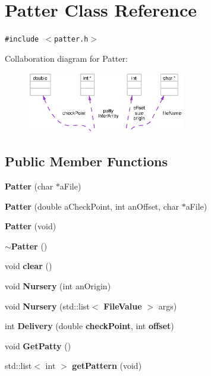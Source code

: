 \section{Patter Class Reference}
\label{classPatter}
{\tt \#include $<$patter.h$>$}

Collaboration diagram for Patter:\begin{figure}[H]
\begin{center}
\leavevmode
\includegraphics[width=194pt]{classPatter__coll__graph}
\end{center}
\end{figure}
\subsection*{Public Member Functions}
\begin{CompactItemize}
\item 
{\bf Patter} (char $\ast$a\-File)
\item 
{\bf Patter} (double a\-Check\-Point, int an\-Offset, char $\ast$a\-File)
\item 
{\bf Patter} (void)
\item 
{\bf $\sim$Patter} ()
\item 
void {\bf clear} ()
\item 
void {\bf Nursery} (int an\-Origin)
\item 
void {\bf Nursery} (std::list$<$ {\bf File\-Value} $>$ args)
\item 
int {\bf Delivery} (double {\bf check\-Point}, int {\bf offset})
\item 
void {\bf Get\-Patty} ()
\item 
std::list$<$ int $>$ {\bf get\-Pattern} (void)
\end{CompactItemize}
